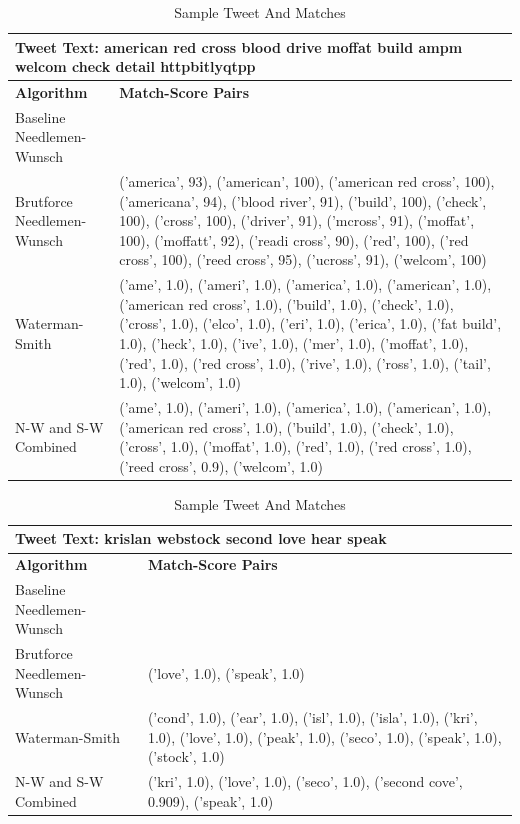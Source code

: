 \documentclass[11pt,a4paper]{article}
\begin{document}
\begin{table} [h]
\caption{Sample Tweet And Matches}
\begin{center}
	\begin{tabular}{| p{5.5cm} | p{10cm} |}
	\hline
	\multicolumn{2}{|p{15.5cm}|}{\textbf{Tweet Text:} american red cross blood drive moffat build ampm welcom check detail httpbitlyqtpp
} \\
	\hline
	\textbf{Algorithm} & \textbf{Match-Score Pairs}\\
	\hline
	Baseline Needlemen-Wunsch & \\
	\hline
	Brutforce Needlemen-Wunsch & ('america', 93), ('american', 100), ('american red cross', 100), ('americana', 94), ('blood river', 91), ('build', 100), ('check', 100), ('cross', 100), ('driver', 91), ('mcross', 91), ('moffat', 100), ('moffatt', 92), ('readi cross', 90), ('red', 100), ('red cross', 100), ('reed cross', 95), ('ucross', 91), ('welcom', 100)\\
	\hline
	Waterman-Smith & ('ame', 1.0), ('ameri', 1.0), ('america', 1.0), ('american', 1.0), ('american red cross', 1.0), ('build', 1.0), ('check', 1.0), ('cross', 1.0), ('elco', 1.0), ('eri', 1.0), ('erica', 1.0), ('fat build', 1.0), ('heck', 1.0), ('ive', 1.0), ('mer', 1.0), ('moffat', 1.0), ('red', 1.0), ('red cross', 1.0), ('rive', 1.0), ('ross', 1.0), ('tail', 1.0), ('welcom', 1.0)\\
	\hline
	N-W and S-W Combined & ('ame', 1.0), ('ameri', 1.0), ('america', 1.0), ('american', 1.0), ('american red cross', 1.0), ('build', 1.0), ('check', 1.0), ('cross', 1.0), ('moffat', 1.0), ('red', 1.0), ('red cross', 1.0), ('reed cross', 0.9), ('welcom', 1.0)\\
	\hline
	\end{tabular}
\end{center}
\label{table:alg-table2}
\end{table}

\begin{table} [t]
\caption{Sample Tweet And Matches}
\begin{center}
	\begin{tabular}{| p{5.5cm} | p{10cm} |}
	\hline
	\multicolumn{2}{|p{15.5cm}|}{\textbf{Tweet Text:} krislan webstock second love hear speak
} \\
	\hline
	\textbf{Algorithm} & \textbf{Match-Score Pairs}\\
	\hline
	Baseline Needlemen-Wunsch & \\
	\hline
	Brutforce Needlemen-Wunsch & ('love', 1.0), ('speak', 1.0)\\
	\hline
	Waterman-Smith & ('cond', 1.0), ('ear', 1.0), ('isl', 1.0), ('isla', 1.0), ('kri', 1.0), ('love', 1.0), ('peak', 1.0), ('seco', 1.0), ('speak', 1.0), ('stock', 1.0)\\
	\hline
	N-W and S-W Combined & ('kri', 1.0), ('love', 1.0), ('seco', 1.0), ('second cove', 0.909), ('speak', 1.0)\\
	\hline
	\end{tabular}
\end{center}
\label{table:alg-table2}
\end{table}
\end{document}
